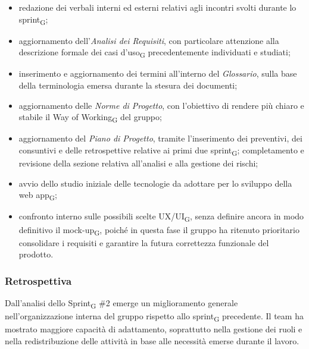 ﻿\documentclass[a4paper, 10pt, colorlinks=true, linkcolor=black, urlcolor=blue, citecolor=blue, hidelinks]{article}
\begin{document}
\begin{itemize}
    \item redazione dei verbali interni ed esterni relativi agli incontri svolti durante lo sprint\textsubscript{G};

    \item aggiornamento dell'\textit{Analisi dei Requisiti}, con particolare attenzione alla descrizione formale dei casi d'uso\textsubscript{G} precedentemente individuati e studiati;

    \item inserimento e aggiornamento dei termini all'interno del \textit{Glossario}, sulla base della terminologia emersa durante la stesura dei documenti;

    \item aggiornamento delle \textit{Norme di Progetto}, con l'obiettivo di rendere più chiaro e stabile il Way of Working\textsubscript{G} del gruppo;

    \item aggiornamento del \textit{Piano di Progetto}, tramite l'inserimento dei preventivi, dei consuntivi e delle retrospettive relative ai primi due sprint\textsubscript{G}; completamento e revisione della sezione relativa all'analisi e alla gestione dei rischi;

    \item avvio dello studio iniziale delle tecnologie da adottare per lo sviluppo della web app\textsubscript{G};

    \item confronto interno sulle possibili scelte UX/UI\textsubscript{G}, senza definire ancora in modo definitivo il mock-up\textsubscript{G}, poiché in questa fase il gruppo ha ritenuto prioritario consolidare i requisiti e garantire la futura correttezza funzionale del prodotto.
\end{itemize}

\subsubsection{Retrospettiva}
Dall'analisi dello Sprint\textsubscript{G} \#2 emerge un miglioramento generale nell'organizzazione interna del gruppo rispetto allo sprint\textsubscript{G} precedente. Il team ha mostrato maggiore capacità di adattamento, soprattutto nella gestione dei ruoli e nella redistribuzione delle attività in base alle necessità emerse durante il lavoro.
\end{document}
